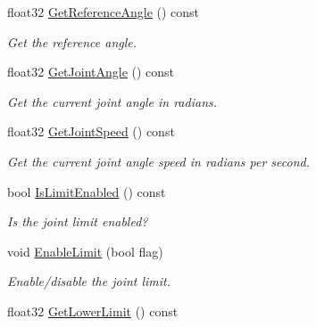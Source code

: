 \begin{DoxyCompactItemize}
float32 \hyperlink{classb2RevoluteJoint_ae84b9659fe94f41f54f43d3f64ee0741}{Get\+Reference\+Angle} () const
\begin{DoxyCompactList}\small\item\em Get the reference angle. \end{DoxyCompactList}\item 
\mbox{\label{classb2RevoluteJoint_a2a83b2276c71bf287771004838f2b507}} 
float32 \hyperlink{classb2RevoluteJoint_a2a83b2276c71bf287771004838f2b507}{Get\+Joint\+Angle} () const
\begin{DoxyCompactList}\small\item\em Get the current joint angle in radians. \end{DoxyCompactList}\item 
\mbox{\label{classb2RevoluteJoint_a631b7bd2c72b61f03b6efc605308092f}} 
float32 \hyperlink{classb2RevoluteJoint_a631b7bd2c72b61f03b6efc605308092f}{Get\+Joint\+Speed} () const
\begin{DoxyCompactList}\small\item\em Get the current joint angle speed in radians per second. \end{DoxyCompactList}\item 
\mbox{\label{classb2RevoluteJoint_a84ff9c4f82b3e7d27a4390164f81f3ab}} 
bool \hyperlink{classb2RevoluteJoint_a84ff9c4f82b3e7d27a4390164f81f3ab}{Is\+Limit\+Enabled} () const
\begin{DoxyCompactList}\small\item\em Is the joint limit enabled? \end{DoxyCompactList}\item 
\mbox{\label{classb2RevoluteJoint_a56bdfdd04e906e52d0258f6a481b9093}} 
void \hyperlink{classb2RevoluteJoint_a56bdfdd04e906e52d0258f6a481b9093}{Enable\+Limit} (bool flag)
\begin{DoxyCompactList}\small\item\em Enable/disable the joint limit. \end{DoxyCompactList}\item 
\mbox{\label{classb2RevoluteJoint_a1e34ad0cc3289d90bff8140c5d6261d2}} 
float32 \hyperlink{classb2RevoluteJoint_a1e34ad0cc3289d90bff8140c5d6261d2}{Get\+Lower\+Limit} () const

\end{DoxyCompactItemize}
